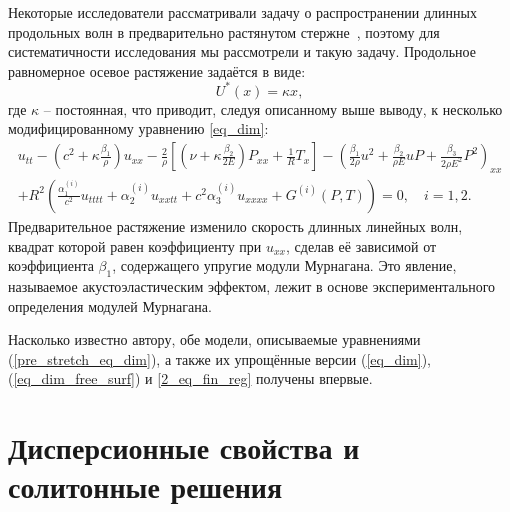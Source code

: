 \documentclass[12pt, a4paper]{article}
\begin{document}
Некоторые исследователи рассматривали задачу о распространении длинных продольных волн в предварительно растянутом стержне~\cite{DC}, поэтому для систематичности исследования мы рассмотрели и такую задачу. 
Продольное равномерное осевое растяжение задаётся в виде:
\begin{equation}\label{pre_stretch_u}
U^*(x) = \kappa x,
\end{equation}
где $\kappa$ -- постоянная, что приводит, следуя описанному выше выводу, к несколько модифицированному уравнению \eqref{eq_dim}:
\begin{equation}\label{pre_stretch_eq_dim}
\begin{split}
u_{tt} - \left(c^2 + \kappa\frac{\beta_1}{\rho}\right) u_{xx} - \frac{2}{\rho}\left[\left(\nu + \kappa \frac{\beta_2}{2E} \right) P_{xx} + \frac1R T_x\right] - \left(\frac{\beta_1}{2\rho} u^2 + \frac{\beta_2}{\rho E} u P + \frac{\beta_3}{2\rho E^2} P^2\right)_{xx}\\
+ R^2 \left(\frac{\alpha_1^{(i)}}{c^2} u_{tttt} + \alpha_2^{(i)} u_{xxtt} + c^2\alpha_3^{(i)} u_{xxxx} + G^{(i)}(P, T) \right) = 0, \quad i = 1,2.
\end{split}
\end{equation}
Предварительное растяжение изменило скорость длинных линейных волн, квадрат которой равен коэффициенту при $u_{xx}$, сделав её зависимой от коэффициента $\beta_1$, содержащего упругие модули Мурнагана. Это явление, называемое акустоэластическим эффектом, лежит в основе экспериментального определения модулей Мурнагана.

Насколько известно автору, обе модели, описываемые уравнениями (\ref{pre_stretch_eq_dim}), а также их упрощённые версии (\ref{eq_dim}), (\ref{eq_dim_free_surf}) и \eqref{2_eq_fin_reg} получены впервые. 



\section{Дисперсионные свойства и солитонные решения}
\end{document}
